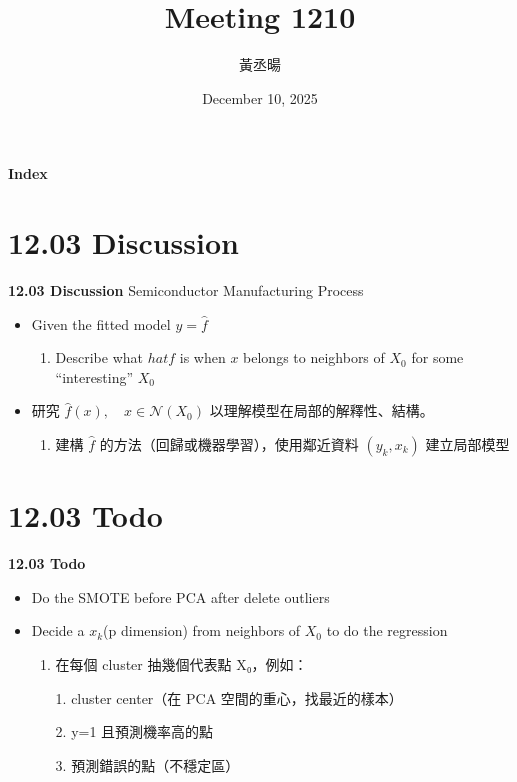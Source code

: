 \documentclass[12pt,aspectratio=43]{beamer}
\title{Meeting 1210}
\author{黃丞暘}
\institute{國立東華大學應數統計所}
\date{December 10, 2025}
\begin{document}
\begin{frame}
  \titlepage
\end{frame}

\begin{frame}{\textbf{Index}}
  \tableofcontents
\end{frame}

\section{12.03 Discussion}

\begin{frame}{\textbf{12.03 Discussion}}
\linespread{1.5}
  Semiconductor Manufacturing Process
  \begin{itemize}
    \item Given the fitted model $y=\hat{f}$
    \begin{enumerate}[]
      \item Describe what $hat{f}$ is when $x$ belongs to neighbors of $X_0$ for some “interesting” $X_0$

    \end{enumerate}
  \end{itemize}
  \begin{itemize}
    \item 研究  $\hat f(x),\quad x \in \mathcal{N}(X_0)$ 以理解模型在局部的解釋性、結構。
    \begin{enumerate}[]
      \item 建構 \(\hat f\) 的方法（回歸或機器學習），使用鄰近資料 \((y_k, x_k)\) 建立局部模型
    \end{enumerate}

  \end{itemize}
\end{frame}

\section{12.03 Todo}

\begin{frame}{\textbf{12.03 Todo}}
\linespread{1.5}
  \begin{itemize}[]
    \item Do the SMOTE before PCA after delete outliers
  \end{itemize}
  \begin{itemize}[]
    \item Decide a $x_k$(p dimension) from neighbors of $X_0$ to do the regression
  \begin{enumerate}[]

    \item 在每個 cluster 抽幾個代表點 X₀，例如：

1. cluster center（在 PCA 空間的重心，找最近的樣本）

2. y=1 且預測機率高的點

3. 預測錯誤的點（不穩定區）
  \end{enumerate}

  \end{itemize}
\end{frame}
\end{document}
